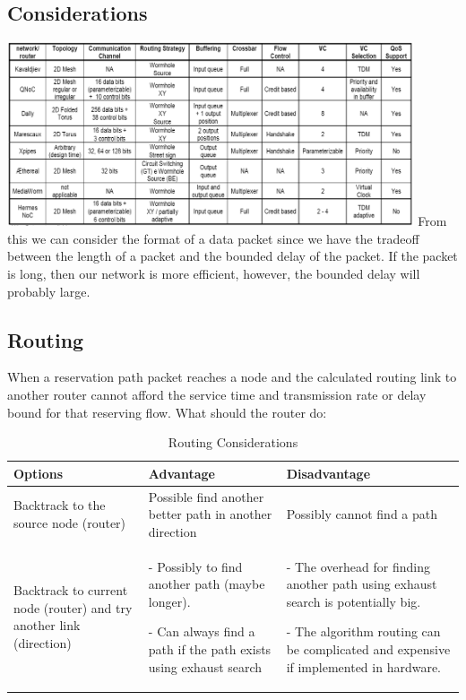 \documentclass[10pt]{article}
\begin{document}
\subsection{Considerations}
\includegraphics[width=12cm]{OtherArcs.png}
From this we can consider the format of a data packet since we have the 
tradeoff between the length of a packet and the bounded delay of the packet. 
If the packet is long, then our network is more efficient, however, the bounded 
delay will probably large.
\subsection{Routing}
When a reservation path packet reaches a node and the calculated routing link 
to another router cannot afford the service time and transmission rate or delay 
bound for that reserving flow. What should the router do:

\begin{table}[h]
\begin{center}
  \begin{tabular}{ | p{3cm} | p{4cm} | p{4cm} |}
    \hline
	Options & Advantage & Disadvantage \\ \hline
	Backtrack to the source node (router) & 
	Possible find another better path in another direction &
	Possibly cannot find a path \\ \hline
	Backtrack to current node (router) and try another link (direction) &
	- Possibly to find another path (maybe longer).  

	- Can always find a path if the path exists using exhaust search	&
	- The overhead for finding another path using exhaust search is potentially  big.

	- The algorithm routing can be complicated and expensive if implemented in hardware. \\
    \hline
  \end{tabular}
\end{center}
\caption{Routing Considerations}
\label{table:RoutingConsiderations}
\end{table}
\end{document}
